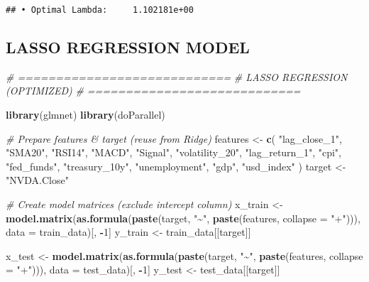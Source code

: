 \documentclass[
]{article}
\newenvironment{Shaded}{\begin{snugshade}}{\end{snugshade}}
\newcommand{\AttributeTok}[1]{\textcolor[rgb]{0.13,0.29,0.53}{#1}}
\newcommand{\CommentTok}[1]{\textcolor[rgb]{0.56,0.35,0.01}{\textit{#1}}}
\newcommand{\DecValTok}[1]{\textcolor[rgb]{0.00,0.00,0.81}{#1}}
\newcommand{\FunctionTok}[1]{\textcolor[rgb]{0.13,0.29,0.53}{\textbf{#1}}}
\newcommand{\NormalTok}[1]{#1}
\newcommand{\OtherTok}[1]{\textcolor[rgb]{0.56,0.35,0.01}{#1}}
\newcommand{\SpecialCharTok}[1]{\textcolor[rgb]{0.81,0.36,0.00}{\textbf{#1}}}
\newcommand{\StringTok}[1]{\textcolor[rgb]{0.31,0.60,0.02}{#1}}
\begin{document}
\begin{verbatim}
## • Optimal Lambda:     1.102181e+00
\end{verbatim}

\subsection{LASSO REGRESSION MODEL}\label{lasso-regression-model}

\begin{Shaded}
\begin{Highlighting}[]
\CommentTok{\# ============================}
\CommentTok{\# LASSO REGRESSION (OPTIMIZED)}
\CommentTok{\# ============================}

\FunctionTok{library}\NormalTok{(glmnet)}
\FunctionTok{library}\NormalTok{(doParallel)}

\CommentTok{\#  Prepare features \& target (reuse from Ridge)}
\NormalTok{features }\OtherTok{\textless{}{-}} \FunctionTok{c}\NormalTok{(}
  \StringTok{"lag\_close\_1"}\NormalTok{, }\StringTok{"SMA20"}\NormalTok{, }\StringTok{"RSI14"}\NormalTok{, }\StringTok{"MACD"}\NormalTok{, }\StringTok{"Signal"}\NormalTok{,}
  \StringTok{"volatility\_20"}\NormalTok{, }\StringTok{"lag\_return\_1"}\NormalTok{,}
  \StringTok{"cpi"}\NormalTok{, }\StringTok{"fed\_funds"}\NormalTok{, }\StringTok{"treasury\_10y"}\NormalTok{, }\StringTok{"unemployment"}\NormalTok{,}
  \StringTok{"gdp"}\NormalTok{, }\StringTok{"usd\_index"}
\NormalTok{)}
\NormalTok{target }\OtherTok{\textless{}{-}} \StringTok{"NVDA.Close"}

\CommentTok{\# Create model matrices (exclude intercept column)}
\NormalTok{x\_train }\OtherTok{\textless{}{-}} \FunctionTok{model.matrix}\NormalTok{(}\FunctionTok{as.formula}\NormalTok{(}\FunctionTok{paste}\NormalTok{(target, }\StringTok{"\textasciitilde{}"}\NormalTok{, }\FunctionTok{paste}\NormalTok{(features, }\AttributeTok{collapse =} \StringTok{"+"}\NormalTok{))), }\AttributeTok{data =}\NormalTok{ train\_data)[, }\SpecialCharTok{{-}}\DecValTok{1}\NormalTok{]}
\NormalTok{y\_train }\OtherTok{\textless{}{-}}\NormalTok{ train\_data[[target]]}

\NormalTok{x\_test }\OtherTok{\textless{}{-}} \FunctionTok{model.matrix}\NormalTok{(}\FunctionTok{as.formula}\NormalTok{(}\FunctionTok{paste}\NormalTok{(target, }\StringTok{"\textasciitilde{}"}\NormalTok{, }\FunctionTok{paste}\NormalTok{(features, }\AttributeTok{collapse =} \StringTok{"+"}\NormalTok{))), }\AttributeTok{data =}\NormalTok{ test\_data)[, }\SpecialCharTok{{-}}\DecValTok{1}\NormalTok{]}
\NormalTok{y\_test }\OtherTok{\textless{}{-}}\NormalTok{ test\_data[[target]]}


\end{Highlighting}
\end{Shaded}
\end{document}
